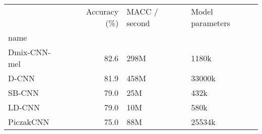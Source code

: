 \begin{tabular}{lrll}
\toprule
{} &  Accuracy (\%) & MACC / second & Model parameters \\
name         &               &               &                  \\
\midrule
Dmix-CNN-mel &          82.6 &          298M &            1180k \\
D-CNN        &          81.9 &          458M &           33000k \\
SB-CNN       &          79.0 &           25M &             432k \\
LD-CNN       &          79.0 &           10M &             580k \\
PiczakCNN    &          75.0 &           88M &           25534k \\
\bottomrule
\end{tabular}
